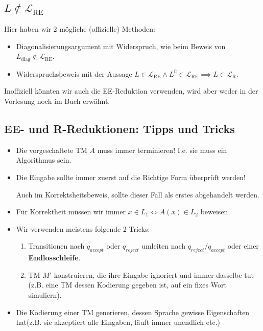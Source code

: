 \documentclass[a4paper, 11pt]{article}
\def\L{\mathcal{L}}
\begin{document}
            
            
                \subsection{$L \notin \L_{\text{RE}}$}

                    Hier haben wir 2 mögliche (offizielle) Methoden:
                    \begin{itemize}[label=-]
                        \item Diagonalisierungsargument mit Widerspruch, wie beim Beweis von $L_{\text{diag}} \notin \L_{\text{RE}}$.
                        \item Widerspruchsbeweis mit der Aussage $L \in \L_{\text{RE}} \land L^\complement \in \L_{\text{RE}} \implies L \in \L_{\text{R}}$.
                    \end{itemize}
                    Inoffiziell könnten wir auch die EE-Reduktion verwenden, wird aber weder in der Vorlesung noch im Buch erwähnt.
            
                \subsection{EE- und R-Reduktionen: Tipps und Tricks}

                    \begin{itemize}[label=-]
                        \item Die vorgeschaltete TM $A$ muss immer terminieren! I.e. sie muss ein Algorithmus sein.
                        
                        \item Die Eingabe sollte immer zuerst auf die Richtige Form überprüft werden!
                        
                        Auch im Korrektsheitsbeweis, sollte dieser Fall als erstes abgehandelt werden.
                        \item Für Korrektheit müssen wir immer $x \in L_1 \iff A(x) \in L_2$ beweisen.
                        
                        \item Wir verwenden meistens folgende 2 Tricks:
                        \begin{enumerate}[label=\roman*.]
                            \item Transitionen nach $q_{accept}$ oder $ q_{reject}$ umleiten nach $q_{reject}$/$q_{accept}$ oder einer \textbf{Endlosschleife}. 
                            \item TM $M'$ konstruieren, die ihre Eingabe ignoriert und immer dasselbe tut (z.B. eine TM dessen Kodierung gegeben ist, auf ein fixes Wort simuliern).
                        \end{enumerate}
                        
                        \item Die Kodierung einer TM generieren, dessen Sprache gewisse Eigenschaften hat(z.B. sie akzeptiert alle Eingaben, läuft immer unendlich etc.)
                    \end{itemize}
    
\end{document}
